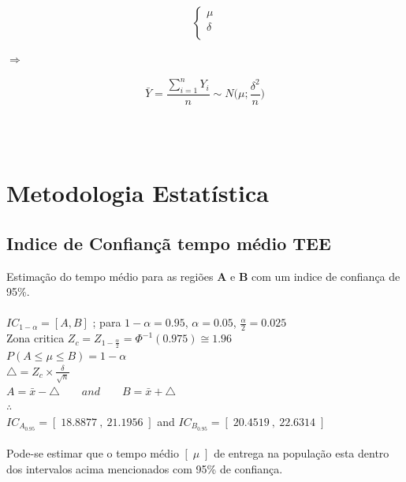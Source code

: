 \begin{minipage}[l]{0pt}
$$\left\lbrace\begin{array}{c}
\mu \\
\delta \\
\end{array}\right.$$
\end{minipage}
\hspace{3cm} $\Longrightarrow$ \hspace{3cm}
\begin{minipage}[l]{0pt}
\[\bar{Y}=\frac{\sum_{i=1}^nY_i}{n}\sim N \big(\mu;\frac{\delta^2}{n}\big)\]
\end{minipage}\\
\\
\newpage
\section{Metodologia Estatística}\label{Metodos}
\noindent
\subsection{Indice de Confiançã tempo médio TEE}
Estimação do tempo médio para as regiões \textbf{A} e \textbf{B} com um indice de confiança de 95\%. \\
\\
$IC_{1-\alpha}=\left[ A, B\right]$ ; para $1-\alpha = 0.95$, $\alpha=0.05$, $\frac{\alpha}{2}=0.025$ \\
Zona critica $Z_c=Z_{1-\frac{\alpha}{2}}=\Phi^{-1}(0.975) \cong 1.96$ \\
$P\left( A \leqslant \mu \leqslant B \right) = 1-\alpha$ \\
$\triangle=Z_c\times\frac{\delta}{\sqrt{n}}$ \\
$A = \bar{x}-\triangle \qquad and \qquad B = \bar{x}+\triangle$ \\
$\therefore$\\
$IC_{A_{0.95}}=\left[ \; 18.8877 \: , \: 21.1956 \; \right]$ \hspace{1cm} and \hspace{1cm} $IC_{B_{0.95}}=\left[ \; 20.4519 \: , \: 22.6314 \; \right]$\\
\\
\noindent
Pode-se estimar que o tempo médio $\left[ \; \mu \; \right]$ de entrega na população  esta dentro dos intervalos acima mencionados com 95\% de confiança.

